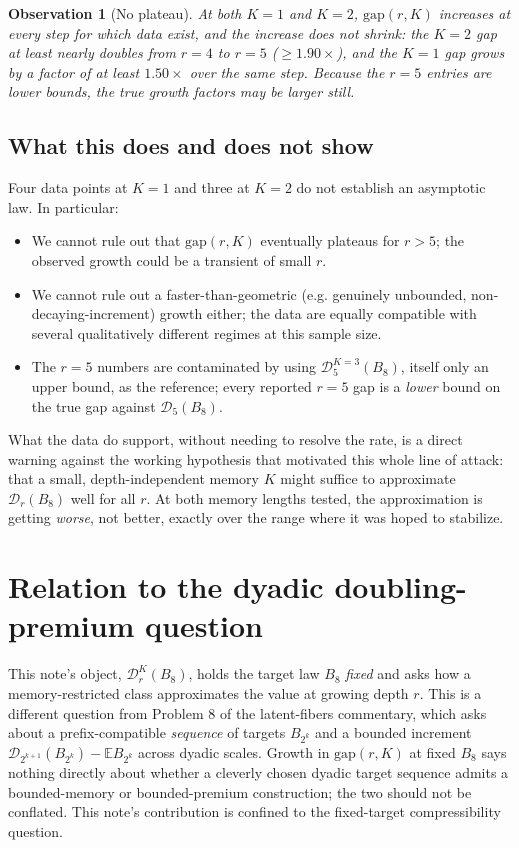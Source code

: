 \documentclass[11pt,a4paper]{article}
\newtheorem{observation}{Observation}
\newcommand{\E}{\mathbb E}
\newcommand{\D}{\mathscr D}
\begin{document}
\begin{observation}[No plateau]
At both $K=1$ and $K=2$, $\mathrm{gap}(r,K)$ increases at every step for
which data exist, and the increase does not shrink: the $K=2$ gap at least
nearly doubles from $r=4$ to $r=5$ ($\ge 1.90\times$), and the $K=1$ gap grows
by a factor of at least $1.50\times$ over the same step. Because the $r=5$
entries are lower bounds, the true growth factors may be larger still.
\end{observation}

\subsection{What this does and does not show}

Four data points at $K=1$ and three at $K=2$ do not establish an asymptotic
law. In particular:
\begin{itemize}
\item We cannot rule out that $\mathrm{gap}(r,K)$ eventually plateaus for
$r>5$; the observed growth could be a transient of small $r$.
\item We cannot rule out a faster-than-geometric (e.g. genuinely unbounded,
non-decaying-increment) growth either; the data are equally compatible with
several qualitatively different regimes at this sample size.
\item The $r=5$ numbers are contaminated by using $\D_5^{K=3}(B_8)$, itself
only an upper bound, as the reference; every reported $r=5$ gap is a
\emph{lower} bound on the true gap against $\D_5(B_8)$.
\end{itemize}
What the data do support, without needing to resolve the rate, is a direct
warning against the working hypothesis that motivated this whole line of
attack: that a small, depth-independent memory $K$ might suffice to
approximate $\D_r(B_8)$ well for all $r$. At both memory lengths tested, the
approximation is getting \emph{worse}, not better, exactly over the range
where it was hoped to stabilize.

\section{Relation to the dyadic doubling-premium question}

This note's object, $\D_r^{K}(B_8)$, holds the target law $B_8$ \emph{fixed}
and asks how a memory-restricted class approximates the value at growing
depth $r$. This is a different question from Problem 8 of the latent-fibers
commentary, which asks about a prefix-compatible \emph{sequence} of targets
$B_{2^k}$ and a bounded increment $\D_{2^{k+1}}(B_{2^k}) - \E B_{2^k}$ across
dyadic scales. Growth in $\mathrm{gap}(r,K)$ at fixed $B_8$ says nothing
directly about whether a cleverly chosen dyadic target sequence admits a
bounded-memory or bounded-premium construction; the two should not be
conflated. This note's contribution is confined to the fixed-target
compressibility question.
\end{document}
